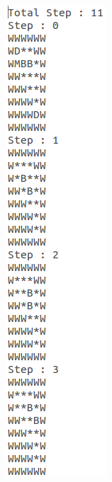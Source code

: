 \documentclass[10pt, letter]{article}
\begin{document}
\begin{figure} [h!]
\centering
\begin{subfigure}{.3\textwidth}
  \centering
  \includegraphics[scale = 0.35]{images/sokoban2-ans1}
\end{subfigure}%
\begin{subfigure}{.3\textwidth}
  \centering

\end{subfigure}
\end{figure}
\end{document}
